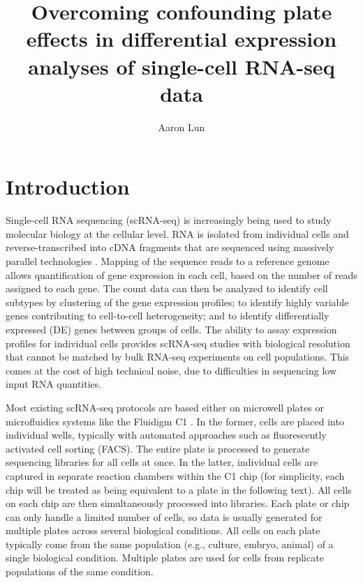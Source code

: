\documentclass{article}
\title{Overcoming confounding plate effects in differential expression analyses of single-cell RNA-seq data}
\author{Aaron Lun}
\begin{document}
\maketitle

\section{Introduction}
Single-cell RNA sequencing (scRNA-seq) is increasingly being used to study molecular biology at the cellular level.
RNA is isolated from individual cells and reverse-transcribed into cDNA fragments that are sequenced using massively parallel technologies \cite{stegle2015computational}.
Mapping of the sequence reads to a reference genome allows quantification of gene expression in each cell, based on the number of reads assigned to each gene.
The count data can then be analyzed to identify cell subtypes by clustering of the gene expression profiles;
    to identify highly variable genes contributing to cell-to-cell heterogeneity;
    and to identify differentially expressed (DE) genes between groups of cells.
The ability to assay expression profiles for individual cells provides scRNA-seq studies with biological resolution that cannot be matched by bulk RNA-seq experiments on cell populations.
This comes at the cost of high technical noise, due to difficulties in sequencing low input RNA quantities.

Most existing scRNA-seq protocols are based either on microwell plates \cite{picelli2014full} or microfluidics systems like the Fluidigm C1 \cite{pollen2014low}.
In the former, cells are placed into individual wells, typically with automated approaches such as fluorescently activated cell sorting (FACS).
The entire plate is processed to generate sequencing libraries for all cells at once.
In the latter, individual cells are captured in separate reaction chambers within the C1 chip 
    (for simplicity, each chip will be treated as being equivalent to a plate in the following text).
All cells on each chip are then simultaneously processed into libraries.
Each plate or chip can only handle a limited number of cells, so data is usually generated for multiple plates across several biological conditions. 
All cells on each plate typically come from the same population (e.g., culture, embryo, animal) of a single biological condition.
Multiple plates are used for cells from replicate populations of the same condition.
\end{document}
